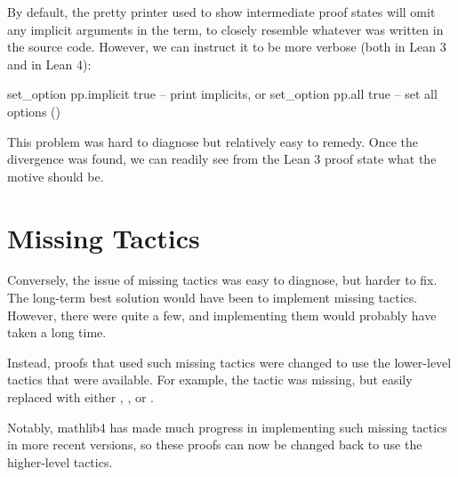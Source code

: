 By default, the pretty printer used to show intermediate proof states will
omit any implicit arguments in the term, to closely resemble whatever was written in the source code.
However, we can instruct it to be more verbose (both in Lean 3 and in Lean 4):
\begin{leancode}
  set_option pp.implicit true -- print implicits, or
  set_option pp.all true      -- set all options ()
\end{leancode}

This problem was hard to diagnose but relatively easy to remedy.
Once the divergence was found, we can readily see from the Lean 3 proof state what the motive should be.


\section{Missing Tactics} 
Conversely, the issue of missing tactics was easy to diagnose, but harder to fix.
The long-term best solution would have been to implement missing tactics.
However, there were quite a few, and implementing them would probably have taken a long time.

Instead, proofs that used such missing tactics were changed to use the lower-level tactics that were
available. For example, the  tactic
was missing, but easily replaced with either , , or .

Notably, mathlib4 has made much progress in implementing such missing tactics in more recent versions, 
so these proofs can now be changed back to use the higher-level tactics.



